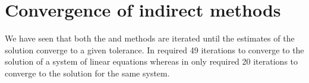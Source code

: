 \documentclass[letterpaper,10pt,english]{jupyterBook}
\begin{document}
\section{Convergence of indirect methods}
\label{\detokenize{7_Indirect_methods/7.3_Convergence_of_indirect_methods:convergence-of-indirect-methods}}\label{\detokenize{7_Indirect_methods/7.3_Convergence_of_indirect_methods:convergence-of-indirect-methods-section}}\label{\detokenize{7_Indirect_methods/7.3_Convergence_of_indirect_methods::doc}}
\sphinxAtStartPar
We have seen that both the {\hyperref[\detokenize{7_Indirect_methods/7.1_Jacobi_method:jacobi-method-section}]{}} and {\hyperref[\detokenize{7_Indirect_methods/7.2_Gauss_Seidel_method:gauss-seidel-method-section}]{}} methods are iterated until the estimates of the solution converge to a given tolerance. In {\hyperref[\detokenize{7_Indirect_methods/7.1_Jacobi_method:jacobi-method-example}]{}} required 49 iterations to converge to the solution of a system of linear equations whereas in {\hyperref[\detokenize{7_Indirect_methods/7.2_Gauss_Seidel_method:gauss-seidel-method-example}]{}} only required 20 iterations to converge to the solution for the same system.
\end{document}

